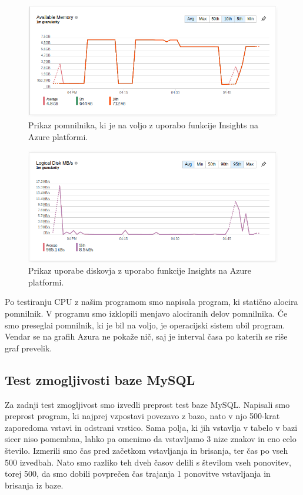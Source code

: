 \begin{figure}[H]
	\centering
	\includegraphics[scale=0.46]{Img/3_ram3.png}
	\caption{Prikaz pomnilnika, ki je na voljo z uporabo funkcije Insights na Azure platformi.}
	\label{fig:3_ram3}
\end{figure}

\begin{figure}[H]
	\centering
	\includegraphics[scale=0.46]{Img/3_ram4.png}
	\caption{Prikaz  uporabe diskovja z uporabo funkcije Insights na Azure platformi.}
	\label{fig:3_ram4}
\end{figure}


Po testiranju CPU z našim programom smo napisala program, ki statično alocira pomnilnik. V programu smo izklopili menjavo alociranih delov pomnilnika. Če smo preseglai pomnilnik, ki je bil na voljo, je operacijski sistem ubil program. Vendar se na grafih Azura ne pokaže nič, saj je interval časa po katerih se riše graf prevelik.

\subsection{Test zmogljivosti baze MySQL}

Za zadnji test zmogljivost smo izvedli preprost test baze MySQL. Napisali smo preprost program, ki najprej vzpostavi povezavo z bazo, nato v njo 500-krat zaporedoma vstavi in odstrani vrstico. Sama polja, ki jih vstavlja v tabelo v bazi sicer niso pomembna, lahko pa omenimo da vstavljamo 3 nize znakov in eno celo število. Izmerili smo čas pred začetkom vstavljanja in brisanja, ter čas po vseh 500 izvedbah. Nato smo razliko teh dveh časov delili s številom vseh ponovitev, torej 500, da smo dobili povprečen čas trajanja 1 ponovitve vstavljanja in brisanja iz baze.

